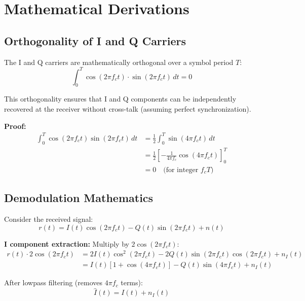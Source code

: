 \section{Mathematical Derivations}

\subsection{Orthogonality of I and Q Carriers}

The I and Q carriers are mathematically orthogonal over a symbol period $T$:
\begin{equation}
\int_0^T \cos(2\pi f_c t) \cdot \sin(2\pi f_c t) \, dt = 0
\end{equation}

This orthogonality ensures that I and Q components can be independently recovered at the receiver without cross-talk (assuming perfect synchronization).

\textbf{Proof:}
\begin{equation}
\begin{aligned}
\int_0^T \cos(2\pi f_c t) \sin(2\pi f_c t) \, dt &= \frac{1}{2}\int_0^T \sin(4\pi f_c t) \, dt \\
&= \frac{1}{2} \left[-\frac{1}{4\pi f_c}\cos(4\pi f_c t)\right]_0^T \\
&= 0 \quad \text{(for integer } f_c T \text{)}
\end{aligned}
\end{equation}

\subsection{Demodulation Mathematics}

Consider the received signal:
\begin{equation}
r(t) = I(t)\cos(2\pi f_c t) - Q(t)\sin(2\pi f_c t) + n(t)
\end{equation}

\textbf{I component extraction:} Multiply by $2\cos(2\pi f_c t)$:
\begin{equation}
\begin{aligned}
r(t) \cdot 2\cos(2\pi f_c t) &= 2I(t)\cos^2(2\pi f_c t) - 2Q(t)\sin(2\pi f_c t)\cos(2\pi f_c t) + n_I(t) \\
&= I(t)[1 + \cos(4\pi f_c t)] - Q(t)\sin(4\pi f_c t) + n_I(t)
\end{aligned}
\end{equation}

After lowpass filtering (removes $4\pi f_c$ terms):
\begin{equation}
\hat{I}(t) = I(t) + n_I(t)
\end{equation}

